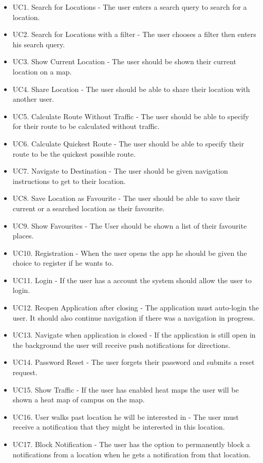 \documentclass[11pt]{article}
\begin{document}
		\begin{itemize}
			\item UC1. Search for Locations - The user enters a search query to search for a location.
			\item UC2. Search for Locations with a filter - The user chooses a filter then enters his search query.
			\item UC3. Show Current Location - The user should be shown their current location on a map.
			\item UC4. Share Location - The user should be able to share their location with another user.
			\item UC5. Calculate Route Without Traffic - The user should be able to specify for their route to be calculated without traffic.
			\item UC6. Calculate Quickest Route - The user should be able to specify their route to be the quickest possible route.
			\item UC7. Navigate to Destination - The user should be given navigation instructions to get to their location.
			\item UC8. Save Location as Favourite - The user should be able to save their current or a searched location as their favourite.
			\item UC9. Show Favourites - The User should be shown a list of their favourite places.
			\item UC10. Registration - When the user opens the app he should be given the choice to register if he wants to.
			\item UC11. Login - If the user has a account the system should allow the user to login.
			\item UC12. Reopen Application after closing - The application must auto-login the user. It should also continue navigation if there was a navigation in progress.
			\item UC13. Navigate when application is closed - If the application is still open in the background the user will receive push notifications for directions.
			\item UC14. Password Reset - The user forgets their password and submits a reset request.
			\item UC15. Show Traffic - If the user has enabled heat maps the user will be shown a heat map of campus on the map.
			\item UC16. User walks past location he will be interested in - The user must receive a notification that they might be interested in this location.
			\item UC17. Block Notification - The user has the option to permanently block a notifications from a location when he gets a notification from that location.

\end{itemize}
\end{document}
